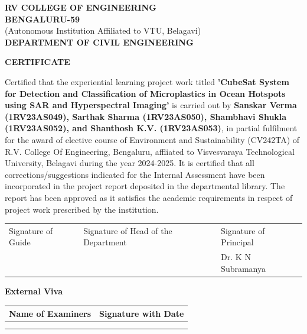 \documentclass[12pt]{article}
\begin{document}
\newpage
\thispagestyle{empty}

\begin{center}
{\large \textbf{RV COLLEGE OF ENGINEERING}}\\
\vspace{0.25cm}
\textbf{BENGALURU-59}\\
\vspace{0.25cm}
{\small (Autonomous Institution Affiliated to VTU, Belagavi)}\\
\vspace{0.25cm}
{\large \textbf{DEPARTMENT OF CIVIL ENGINEERING}}

\vspace{1cm}
{\Large \textbf{CERTIFICATE}}
\end{center}

\vspace{1cm}

Certified that the experiential learning project work titled \textbf{'CubeSat System for Detection and Classification of Microplastics in Ocean Hotspots using SAR and Hyperspectral Imaging'} is carried out by \textbf{Sanskar Verma (1RV23AS049), Sarthak Sharma (1RV23AS050), Shambhavi Shukla (1RV23AS052), and Shanthosh K.V. (1RV23AS053)}, in partial fulfilment for the award of elective course of Environment and Sustainability (CV242TA) of R.V. College Of Engineering, Bengaluru, affliated to Visvesvaraya Technological University, Belagavi during the year 2024-2025. It is certified that all corrections/suggestions indicated for the Internal Assessment have been incorporated in the project report deposited in the departmental library. The report has been approved as it satisfies the academic requirements in respect of project work prescribed by the institution.

\vspace{3cm}

\begin{tabular}{p{}p{}p{}}
Signature of Guide & Signature of Head of the Department & Signature of Principal \\
& & Dr. K N Subramanya \\
\end{tabular}

\vspace{2cm}

\textbf{External Viva}

\begin{tabular}{|p{}|p{}|}
\hline
Name of Examiners & Signature with Date \\
\hline
& \\
& \\
\hline
\end{tabular}
\end{document}
